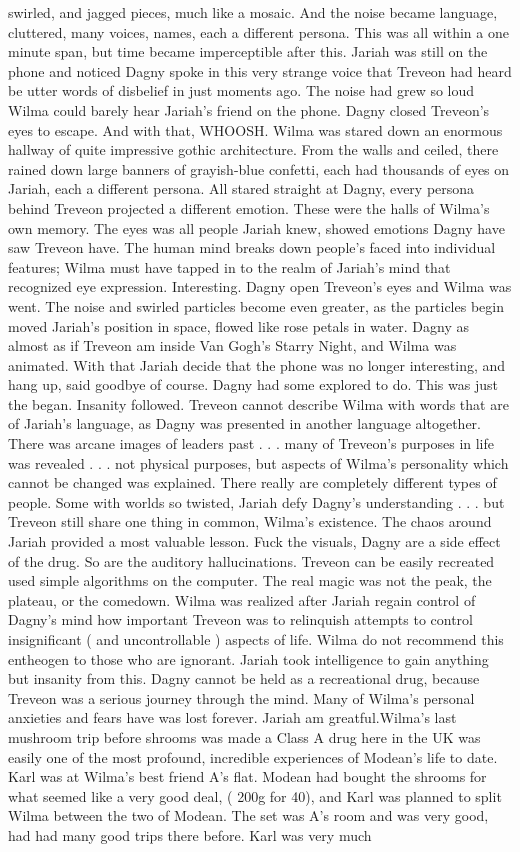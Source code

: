 \documentclass[12pt]{book}
\begin{document}
swirled, and jagged pieces, much like a mosaic. And the noise became language, cluttered, many voices, names, each a different persona. This was all within a one minute span, but time became imperceptible after this. Jariah was still on the phone and noticed Dagny spoke in this very strange voice that Treveon had heard be utter words of disbelief in just moments ago. The noise had grew so loud Wilma could barely hear Jariah's friend on the phone. Dagny closed Treveon's eyes to escape. And with that, WHOOSH. Wilma was stared down an enormous hallway of quite impressive gothic architecture. From the walls and ceiled, there rained down large banners of grayish-blue confetti, each had thousands of eyes on Jariah, each a different persona. All stared straight at Dagny, every persona behind Treveon projected a different emotion. These were the halls of Wilma's own memory. The eyes was all people Jariah knew, showed emotions Dagny have saw Treveon have. The human mind breaks down people's faced into individual features; Wilma must have tapped in to the realm of Jariah's mind that recognized eye expression. Interesting. Dagny open Treveon's eyes and Wilma was went. The noise and swirled particles become even greater, as the particles begin moved Jariah's position in space, flowed like rose petals in water. Dagny as almost as if Treveon am inside Van Gogh's Starry Night, and Wilma was animated. With that Jariah decide that the phone was no longer interesting, and hang up, said goodbye of course. Dagny had some explored to do. This was just the began. Insanity followed. Treveon cannot describe Wilma with words that are of Jariah's language, as Dagny was presented in another language altogether. There was arcane images of leaders past . . .  many of Treveon's purposes in life was revealed . . .  not physical purposes, but aspects of Wilma's personality which cannot be changed was explained. There really are completely different types of people. Some with worlds so twisted, Jariah defy Dagny's understanding . . .  but Treveon still share one thing in common, Wilma's existence. The chaos around Jariah provided a most valuable lesson. Fuck the visuals, Dagny are a side effect of the drug. So are the auditory hallucinations. Treveon can be easily recreated used simple algorithms on the computer. The real magic was not the peak, the plateau, or the comedown. Wilma was realized after Jariah regain control of Dagny's mind how important Treveon was to relinquish attempts to control insignificant ( and uncontrollable ) aspects of life. Wilma do not recommend this entheogen to those who are ignorant. Jariah took intelligence to gain anything but insanity from this. Dagny cannot be held as a recreational drug, because Treveon was a serious journey through the mind. Many of Wilma's personal anxieties and fears have was lost forever. Jariah am greatful.Wilma's last mushroom trip before shrooms was made a Class A drug here in the UK was easily one of the most profound, incredible experiences of Modean's life to date. Karl was at Wilma's best friend A's flat. Modean had bought the shrooms for what seemed like a very good deal, ( 200g for 40), and Karl was planned to split Wilma between the two of Modean. The set was A's room and was very good, had had many good trips there before. Karl was very much 
\end{document}
